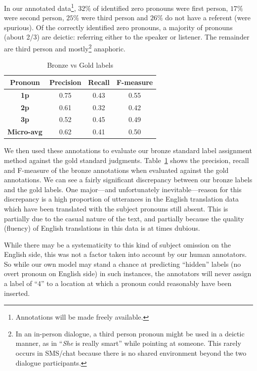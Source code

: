 \documentclass[11pt]{report}
\begin{document}
In our annotated data\footnote{Annotations will be made freely available.}, $32\%$ of identified zero pronouns were first person, $17\%$ were second person, $25\%$ were third person and $26\%$ do not have a referent (were spurious). Of the correctly identified zero pronouns, a majority of pronouns (about 2/3) are deictic: referring either to the speaker or listener. The remainder are third person and mostly\footnote{In an in-person dialogue, a third person pronoun might be used in a deictic manner, as in ``\emph{She} is really smart'' while pointing at someone. This rarely occurs in SMS/chat because there is no shared environment beyond the two dialogue participants.} anaphoric.

\begin{table}
\begin{footnotesize}
\begin{center}
\begin{tabular}{|c|c|c|c|}
\hline \bf Pronoun & \bf Precision & \bf Recall & \bf F-measure \\ \hline 
\bf 1p & 0.75 & 0.43 & 0.55 \\ \hline
\bf 2p & 0.61 & 0.32 & 0.42 \\ \hline
\bf 3p & 0.52 & 0.45 & 0.49 \\ \hline
\bf Micro-avg & 0.62 & 0.41 & 0.50 \\ \hline
\end{tabular}
\end{center}
\end{footnotesize}
\caption{\label{bronze-vs-gold} Bronze vs Gold labels}
\end{table}

We then used these annotations to evaluate our bronze standard label assignment method against the gold standard judgments. Table~\ref{bronze-vs-gold} shows the precision, recall and F-measure of the bronze annotations when evaluated against the gold annotations. We can see a fairly significant discrepancy between our bronze labels and the gold labels. One major---and unfortunately inevitable---reason for this discrepancy is a high proportion of utterances in the English translation data which have been translated with the subject pronouns still absent. This is partially due to the casual nature of the text, and partially because the quality (fluency) of English translations in this data is at times dubious.

While there may be a systematicity to this kind of subject omission on the English side, this was not a factor taken into account by our human annotators. So while our own model may stand a chance at predicting ``hidden'' labels (no overt pronoun on English side) in such instances, the annotators will never assign a label of ``4'' to a location at which a pronoun could reasonably have been inserted.
\end{document}
